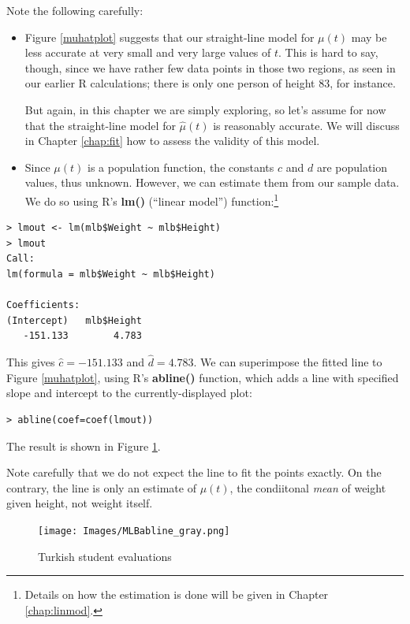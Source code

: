 Note the following carefully:

\begin{itemize}

\item Figure \ref{muhatplot} suggests that our straight-line model for
$\mu(t)$ may be less accurate at very small and very large
values of $t$.  This is hard to say, though, since we have rather few
data points in those two regions, as seen in our earlier R calculations;
there is only one person of height 83, for instance.

But again, in this chapter we are simply exploring, so let's assume for
now that the straight-line model for $\widehat{\mu}(t)$ is reasonably
accurate.  We will discuss in Chapter \ref{chap:fit} how to assess the
validity of this model.

\item Since $\mu(t)$ is a population function, the constants
$c$ and $d$ are population values, thus unknown.  However, we can
estimate them from our sample data.  We do so using R's {\bf lm()}
(``linear model'') function:\footnote{Details on how the estimation is
done will be given in Chapter \ref{chap:linmod}.}
 
\end{itemize}

\begin{lstlisting}
> lmout <- lm(mlb$Weight ~ mlb$Height)
> lmout
Call:
lm(formula = mlb$Weight ~ mlb$Height)

Coefficients:
(Intercept)   mlb$Height  
   -151.133        4.783  
\end{lstlisting}

This gives $\widehat{c} = -151.133$ and $\widehat{d} = 4.783$.  We can
superimpose the fitted line to Figure \ref{muhatplot}, using R's {\bf
abline()} function, which adds a line with specified slope and intercept
to the currently-displayed plot:

\begin{lstlisting}
> abline(coef=coef(lmout))
\end{lstlisting}

The result is shown in Figure \ref{addedabline}.

Note carefully that we do not expect the line to fit the points
exactly.  On the contrary, the line is only an estimate of $\mu(t)$, the
condiitonal {\it mean} of weight given height, not weight itself.

\begin{figure}[tb]
\vskip 0.5in
\centerline{
\texttt{[image: Images/MLBabline\_gray.png]}
}
\caption{Turkish student evaluations}
\label{addedabline}
\end{figure}

